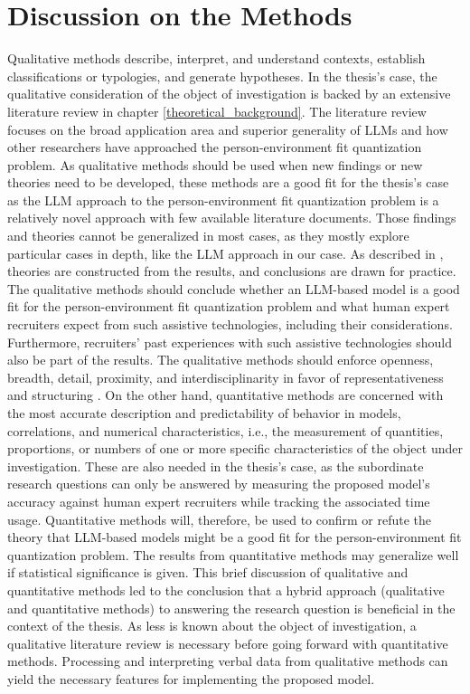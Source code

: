 \documentclass[draft,final]{thesisclass} %
\begin{document}
\section{Discussion on the Methods}
Qualitative methods describe, interpret, and understand contexts, establish classifications or typologies, and generate hypotheses.
In the thesis's case, the qualitative consideration of the object of investigation is backed by an extensive literature review in chapter \ref{theoretical_background}.
The literature review focuses on the broad application area and superior generality of \gls{LLM}s and how other researchers have approached the person-environment fit quantization problem.
As qualitative methods should be used when new findings or new theories need to be developed, these methods are a good fit for the thesis's case as the \gls{LLM} approach to the person-environment fit quantization problem is a relatively novel approach with few available literature documents.
Those findings and theories cannot be generalized in most cases, as they mostly explore particular cases in depth, like the \gls{LLM} approach in our case.
As described in \textcite[127]{qualitative_methods}, theories are constructed from the results, and conclusions are drawn for practice.
The qualitative methods should conclude whether an \gls{LLM}-based model is a good fit for the person-environment fit quantization problem and what human expert recruiters expect from such assistive technologies, including their considerations.
Furthermore, recruiters' past experiences with such assistive technologies should also be part of the results.
The qualitative methods should enforce openness, breadth, detail, proximity, and interdisciplinarity in favor of representativeness and structuring \parencite[127]{qualitative_methods}.
On the other hand, quantitative methods are concerned with the most accurate description and predictability of behavior in models, correlations, and numerical characteristics, i.e., the measurement of quantities, proportions, or numbers of one or more specific characteristics of the object under investigation.
These are also needed in the thesis's case, as the subordinate research questions can only be answered by measuring the proposed model's accuracy against human expert recruiters while tracking the associated time usage.
Quantitative methods will, therefore, be used to confirm or refute the theory that \gls{LLM}-based models might be a good fit for the person-environment fit quantization problem.
The results from quantitative methods may generalize well if statistical significance is given.
This brief discussion of qualitative and quantitative methods led to the conclusion that a hybrid approach (qualitative and quantitative methods) to answering the research question is beneficial in the context of the thesis.
As less is known about the object of investigation, a qualitative literature review is necessary before going forward with quantitative methods.
Processing and interpreting verbal data from qualitative methods can yield the necessary features for implementing the proposed model.
\end{document}
